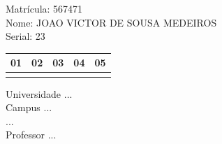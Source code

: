 \documentclass[10pt,a4paper,twocolumn]{report}
\begin{document}
Matrícula: 567471\\ Nome: JOAO VICTOR DE SOUSA MEDEIROS \\ Serial: 23\\
\begin{tabular}{|l|l|l|l|l|}\hline
01  &02  &03  &04  &05 \\ \hline 
 & & & & \\ \hline 
\end{tabular}
 \cleardoublepage 

\begin{flushleft}
Universidade ...\\
Campus ...\\
...\\
Professor ...\\
\end{flushleft}
\end{document}
